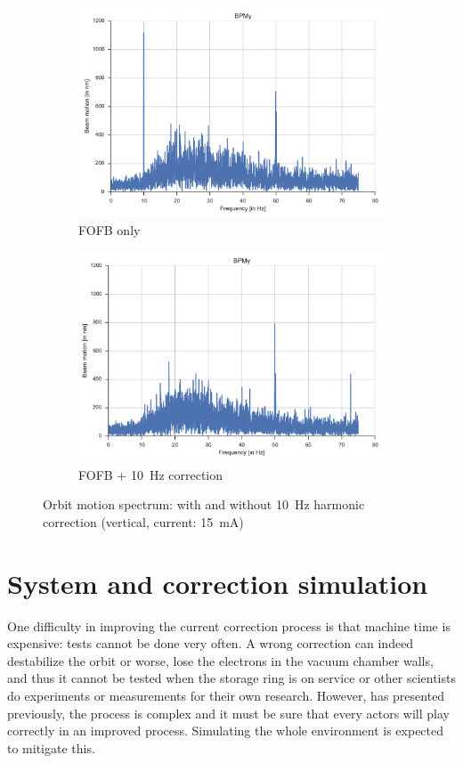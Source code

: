 \begin{figure}
    \centering
    \begin{subfigure}[b]{0.8\textwidth}
        \includegraphics[width=\linewidth]{img/fft_fofb_low}
        \caption{FOFB only}
    \end{subfigure}
    \begin{subfigure}[b]{0.8\textwidth}
    \includegraphics[width=\linewidth]{img/fft_fofb_dyn_low}
    \caption{FOFB + \SI{10}{\hertz} correction}
    \end{subfigure}
    \caption{\label{fig:compare_dyn_corr}Orbit motion spectrum: with and without \SI{10}{\hertz} harmonic correction (vertical, current: \SI{15}{\milli\ampere})}
\end{figure}


\section{System and correction simulation}
One difficulty in improving the current correction process is that machine time is expensive: tests cannot be done very often. A wrong correction can indeed destabilize the orbit or worse, lose the electrons in the vacuum chamber walls, and thus it cannot be tested when the storage ring is on service or other scientists do experiments or measurements for their own research. However, has presented previously, the process is complex and it must be sure that every actors will play correctly in an improved process. Simulating the whole environment is expected to mitigate this.

